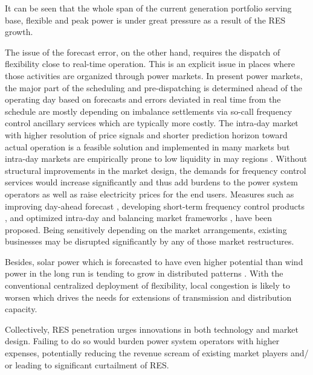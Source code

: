 It can be seen that the whole span of the current generation portfolio serving base, flexible and peak power is under great pressure as a result of the RES growth.

The issue of the forecast error, on the other hand, requires the dispatch of flexibility close to real-time operation. This is an explicit issue in places where those activities are organized through power markets. In present power markets, the major part of the scheduling and pre-dispatching is determined ahead of the operating day based on forecasts and errors deviated in real time from the schedule are mostly depending on imbalance settlements via so-call frequency control ancillary services which are typically more costly\cite{Ranci2013,Srivastava2011}. The intra-day market with higher resolution of price signals and shorter prediction horizon toward actual operation is a feasible solution and implemented in many markets\cite{Srivastava2011} but intra-day markets are empirically prone to low liquidity in may regions \cite{Lund2015, Hagemann2015,Weber2010}. Without structural improvements in the market design, the demands for frequency control services would increase significantly and thus add burdens to the power system operators \cite{GEEnergyConsulting2014,Krad2017,Koch2009} as well as raise electricity prices for the end users. Measures such as improving day-ahead forecast \cite{Woo2016}, developing short-term frequency control products \cite{Gonzalez-Aparicio2015}, and optimized intra-day \cite{Weber2010} and balancing market frameworks \cite{Wartsila2014}, have been proposed. Being sensitively depending on the market arrangements, existing businesses may be disrupted significantly by any of those market restructures.

Besides, solar power which is forecasted to have even higher potential than wind power in the long run is tending to grow in distributed patterns \cite{Agency2016,Epia2016,Sawyer2016}. With the conventional centralized deployment of flexibility, local congestion is likely to worsen \cite{Lund2015,STEINKE2013826} which drives the needs for extensions of transmission and distribution capacity.

Collectively, RES penetration urges innovations in both technology and market design. Failing to do so would burden power system operators with higher expenses, potentially reducing the revenue scream of existing market players and/ or leading to significant curtailment of RES.

